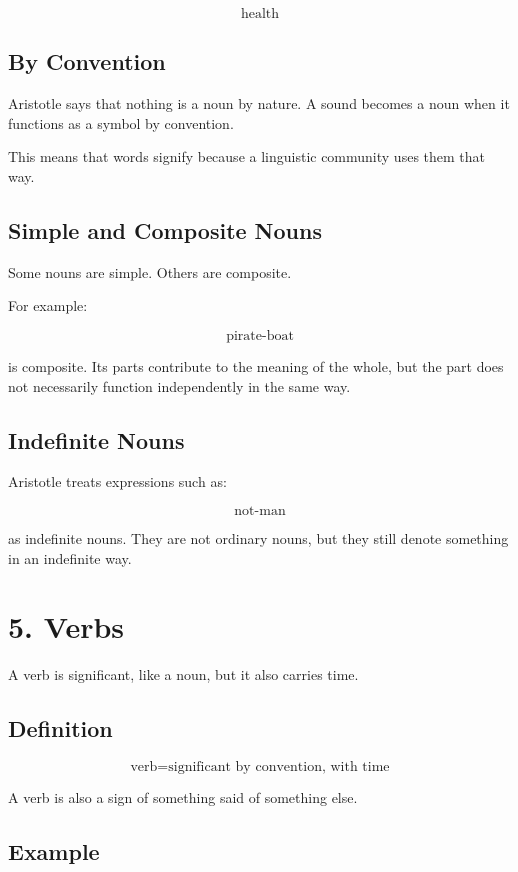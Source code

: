 \documentclass[12pt]{article}
\begin{document}
\[
\text{health}
\]

\subsection*{By Convention}

Aristotle says that nothing is a noun by nature. A sound becomes a noun when it
functions as a symbol by convention.

This means that words signify because a linguistic community uses them that
way.

\subsection*{Simple and Composite Nouns}

Some nouns are simple. Others are composite.

For example:

\[
\text{pirate-boat}
\]

is composite. Its parts contribute to the meaning of the whole, but the part
does not necessarily function independently in the same way.

\subsection*{Indefinite Nouns}

Aristotle treats expressions such as:

\[
\text{not-man}
\]

as indefinite nouns. They are not ordinary nouns, but they still denote
something in an indefinite way.

\section*{5. Verbs}

A verb is significant, like a noun, but it also carries time.

\subsection*{Definition}

\[
\boxed{
\text{verb} = \text{significant by convention, with time}
}
\]

A verb is also a sign of something said of something else.

\subsection*{Example}
\end{document}
